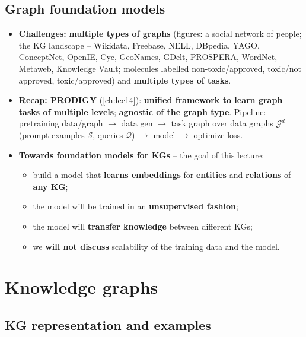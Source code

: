 \subsection{Graph foundation models}\label{sec:lec15-gfm}

\begin{itemize}
  \item \textbf{Challenges:} \textbf{multiple types of graphs} (figures: a social network
    of people; the KG landscape -- Wikidata, Freebase, NELL, DBpedia, YAGO, ConceptNet,
    OpenIE, Cyc, GeoNames, GDelt, PROSPERA, WordNet, Metaweb, Knowledge Vault; molecules
    labelled non-toxic/approved, toxic/not approved, toxic/approved) and
    \textbf{multiple types of tasks}.
  \item \textbf{Recap: PRODIGY} (\cref{ch:lec14}): \textbf{unified framework to learn
    graph tasks of multiple levels}; \textbf{agnostic of the graph type}. Pipeline:
    pretraining data/graph $\to$ data gen $\to$ task graph over data graphs
    $\mathcal{G}^d$ (prompt examples $\mathcal{S}$, queries $\mathcal{Q}$) $\to$ model
    $\to$ optimize loss.
  \item \textbf{Towards foundation models for KGs} -- the goal of this lecture:
    \begin{itemize}
      \item build a model that \textbf{learns embeddings} for \textbf{entities} and
        \textbf{relations} of \textbf{any KG};
      \item the model will be trained in an \textbf{unsupervised fashion};
      \item the model will \textbf{transfer knowledge} between different KGs;
      \item we \textbf{will not discuss} scalability of the training data and the model.
    \end{itemize}
\end{itemize}

\section{Knowledge graphs}\label{sec:lec15-kg}

\subsection{KG representation and examples}\label{sec:lec15-kgrep}

